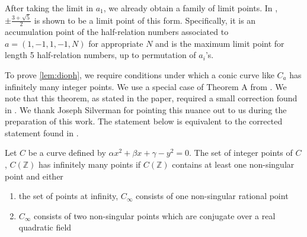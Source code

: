 \documentclass[11 pt]{amsart}
\begin{document}
\begin{remark}
    After taking the limit in \(a_1\), we already obtain a family of limit points. In \cite{Smilga2021}, $\pm\frac{3+\sqrt{5}}{2}$ is shown to be a limit point of this form. Specifically, it is an accumulation point of the half-relation numbers associated to \(a=(1, -1, 1, -1, N)\) for appropriate $N$ and is the maximum limit point for length 5 half-relation numbers, up to permutation of \(a_i\)'s. 
\end{remark}

To prove \cref{lem:dioph}, we require conditions under which a conic curve like $C_{a}$ has infinitely many integer points. We use a special case of Theorem A from \cite{SILVERMAN2000163}. We note that this theorem, as stated in the paper, required a small correction found in \cite{poulakis-2003}. We thank Joseph Silverman for pointing this nuance out to us during the preparation of this work. The statement below is equivalent to the corrected statement found in \cite{poulakis-2003}.



\begin{theorem}\label{silverman}
Let \(C\) be a curve defined by \(\alpha x^2 + \beta x+ \gamma-y^2=0\). The set of integer points of $C$, $C(\mathbb{Z})$ has infinitely many points if $C(\mathbb{Z})$ contains at least one non-singular point and either
\begin{enumerate}
	\item the set of points at infinity, $C_{\infty}$ consists of one non-singular rational point

	\item $C_{\infty}$ consists of two non-singular points which are conjugate over a real quadratic field
\end{enumerate}
\end{theorem}
\end{document}
